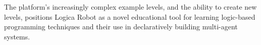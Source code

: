 \documentclass[sigconf]{acmart}
\begin{document}
\noindent
The platform's increasingly complex example levels, and the ability to create new levels, positions Logica Robot as a novel educational tool for learning logic-based programming techniques and their use in declaratively building multi-agent systems.




 


\end{document}
